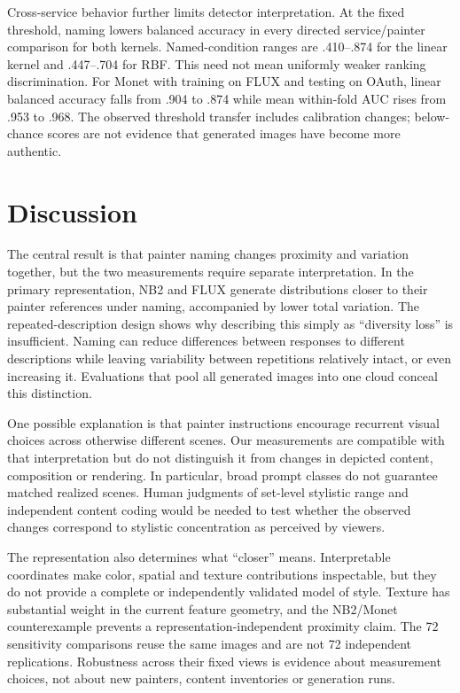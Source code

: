\documentclass[11pt]{article}
\begin{document}
Cross-service behavior further limits detector interpretation. At the fixed
threshold, naming lowers balanced accuracy in every directed service/painter
comparison for both kernels. Named-condition ranges are .410--.874 for the
linear kernel and .447--.704 for RBF. This need not mean uniformly weaker
ranking discrimination. For Monet with training on FLUX and testing on OAuth,
linear balanced accuracy falls from .904 to .874 while mean within-fold AUC
rises from .953 to .968. The observed threshold transfer includes calibration
changes; below-chance scores are not evidence that generated images have become
more authentic.

\section{Discussion}
The central result is that painter naming changes proximity and variation
together, but the two measurements require separate interpretation. In the
primary representation, NB2 and FLUX generate distributions closer to their
painter references under naming, accompanied by lower total variation. The
repeated-description design shows why describing this simply as ``diversity
loss'' is insufficient. Naming can reduce differences between responses to
different descriptions while leaving variability between repetitions relatively
intact, or even increasing it. Evaluations that pool all generated images into
one cloud conceal this distinction.

One possible explanation is that painter instructions encourage recurrent visual
choices across otherwise different scenes. Our measurements are compatible with
that interpretation but do not distinguish it from changes in depicted content,
composition or rendering. In particular, broad prompt classes do not guarantee
matched realized scenes. Human judgments of set-level stylistic range and
independent content coding would be needed to test whether the observed changes
correspond to stylistic concentration as perceived by viewers.

The representation also determines what ``closer'' means. Interpretable
coordinates make color, spatial and texture contributions inspectable, but they
do not provide a complete or independently validated model of style. Texture
has substantial weight in the current feature geometry, and the NB2/Monet
counterexample prevents a representation-independent proximity claim. The 72
sensitivity comparisons reuse the same images and are not 72 independent
replications. Robustness across their fixed views is evidence about measurement
choices, not about new painters, content inventories or generation runs.
\end{document}
